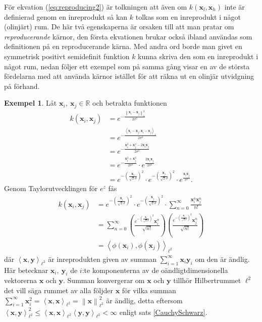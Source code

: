 \documentclass[a4paper, 12pt]{report}
\theoremstyle{definition}
\newtheorem{ex}{Exempel}[section]
\theoremstyle{remark}
\newcommand{\bfx}{\mathbf{x}}
\newcommand{\bfy}{\mathbf{y}}
\newcommand{\llangle}{\left\langle}
\newcommand{\rrangle}{\right\rangle}
\newcommand{\inner}[2]{\llangle #1, #2 \rrangle}
\begin{document}
För ekvation (\ref{eq:reproducing2}) är tolkningen att även om $k\left(\bfx_l, \bfx_h\right)$ inte är definierad genom en inreprodukt så kan $k$ tolkas som en inreprodukt i något (olinjärt) rum. De här två egenskaperna är orsaken till att man pratar om \emph{reproducerande} kärnor, den första ekvationen brukar också ibland användas som definitionen på en reproducerande kärna. Med andra ord borde man givet en symmetrisk positivt semidefinit funktion $k$ kunna skriva den som en inreprodukt i något rum, nedan följer ett exempel som på samma gång visar en av de största fördelarna med att använda kärnor istället för att räkna ut en olinjär utvidgning på förhand.

\begin{ex}
	Låt $\bfx_i,~\bfx_j\in\mathbb{R}$ och betrakta funktionen
	\begin{align*}
		k\left(\bfx_i, \bfx_j\right)&=e^{-\frac{\left\| \bfx_i-\bfx_j\right\|_1^2}{2\sigma^2}}\\&=e^{-\frac{\inner{\bfx_i-\bfx_j}{\bfx_i-\bfx_j}_1}{2\sigma^2}}\\
		&=e^{-\frac{\bfx_i^2+\bfx_j^2-2\bfx_i\bfx_j}{2\sigma^2}}\\&=e^{-\frac{\bfx_i^2+\bfx_j^2}{2\sigma^2}}\cdot e^{\frac{2\bfx_i\bfx_j}{2\sigma^2}}\\
		&= e^{-\left(\frac{\bfx_i}{\sqrt{2}\sigma}\right)^2}\cdot e^{-\left(\frac{\bfx_j}{\sqrt{2}\sigma}\right)^2}\cdot e^{\frac{\bfx_i\bfx_j}{\sigma^2}}.
	\end{align*}
	Genom Taylorutvecklingen för $e^{z}$ fås
	\begin{align*}
		k\left(\bfx_i, \bfx_j\right)&= e^{-\left(\frac{\bfx_i}{\sqrt{2}\sigma}\right)^2}\cdot e^{-\left(\frac{\bfx_j}{\sqrt{2}\sigma}\right)^2}\cdot \sum_{n=0}^{\infty}\frac{\bfx_i^n\bfx_j^n}{n!}\\
		&= \sum_{n=0}^{\infty} \left(\frac{e^{-\left(\frac{\bfx_i}{\sqrt{2}\sigma}\right)^2} \bfx_i^n}{\sqrt{n!}}\right)\left(\frac{e^{-\left(\frac{\bfx_j}{\sqrt{2}\sigma}\right)^2} \bfx_j^n}{\sqrt{n!}}\right)\\
		&= \inner{\phi\left(\bfx_i\right)}{\phi\left(\bfx_j\right)}_{\ell^2}
	\end{align*}
	där $\inner{\bfx}{\bfy}_{\ell^2}$ är inreprodukten given av summan $\sum_{i=1}^{\infty}\bfx_i\bfy_i$ om den är ändlig. Här betecknar $\bfx_i,~\bfy_i$ de $i$:te komponenterna av de oändligtdimensionella vektorerna $\bfx$ och $\bfy$. Summan konvergerar om $\bfx$ och $\bfy$ tillhör Hilbertrummet $\ell^2$ det vill säga rummet av alla följder $\bfx$ för vilka summan $\sum_{i=1}^{\infty}\bfx_i^2=\inner{\bfx}{\bfx}_{\ell^2}=\left\|\bfx\right\|_{\ell^2}^2$ är ändlig, detta eftersom $\inner{\bfx}{\bfy}_{\ell^2}^2\leq\inner{\bfx}{\bfx}_{\ell^2}\inner{\bfy}{\bfy}_{\ell^2}<\infty$ enligt sats \ref{CauchySchwarz}.
	

\end{ex}
\end{document}
